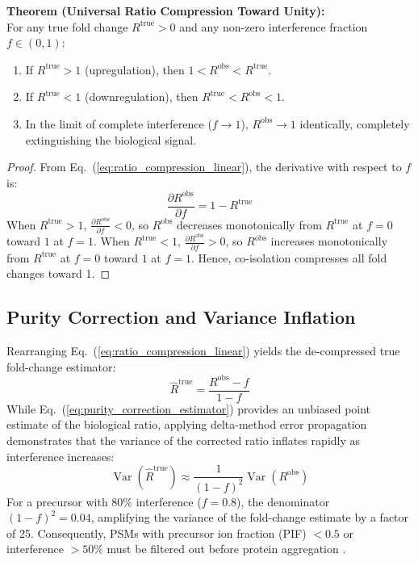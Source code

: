 \documentclass[11pt,oneside]{book}
\begin{document}
\begin{deepdive}
\textbf{Theorem (Universal Ratio Compression Toward Unity):}\\
For any true fold change $R^{\text{true}} > 0$ and any non-zero interference fraction $f \in (0, 1)$:
\begin{enumerate}
    \item If $R^{\text{true}} > 1$ (upregulation), then $1 < R^{\text{obs}} < R^{\text{true}}$.
    \item If $R^{\text{true}} < 1$ (downregulation), then $R^{\text{true}} < R^{\text{obs}} < 1$.
    \item In the limit of complete interference ($f \to 1$), $R^{\text{obs}} \to 1$ identically, completely extinguishing the biological signal.
\end{enumerate}
\begin{proof}
From Eq.~(\ref{eq:ratio_compression_linear}), the derivative with respect to $f$ is:
$$\frac{\partial R^{\text{obs}}}{\partial f} = 1 - R^{\text{true}}$$
When $R^{\text{true}} > 1$, $\frac{\partial R^{\text{obs}}}{\partial f} < 0$, so $R^{\text{obs}}$ decreases monotonically from $R^{\text{true}}$ at $f = 0$ toward $1$ at $f = 1$. When $R^{\text{true}} < 1$, $\frac{\partial R^{\text{obs}}}{\partial f} > 0$, so $R^{\text{obs}}$ increases monotonically from $R^{\text{true}}$ at $f = 0$ toward $1$ at $f = 1$. Hence, co-isolation compresses all fold changes toward 1.
\end{proof}
\end{deepdive}

\subsection{Purity Correction and Variance Inflation}
Rearranging Eq.~(\ref{eq:ratio_compression_linear}) yields the de-compressed true fold-change estimator:
\begin{equation}
\hat{R}^{\text{true}} = \frac{R^{\text{obs}} - f}{1 - f}
\label{eq:purity_correction_estimator}
\end{equation}
While Eq.~(\ref{eq:purity_correction_estimator}) provides an unbiased point estimate of the biological ratio, applying delta-method error propagation demonstrates that the variance of the corrected ratio inflates rapidly as interference increases:
\begin{equation}
\operatorname{Var}\left( \hat{R}^{\text{true}} \right) \approx \frac{1}{(1 - f)^2} \operatorname{Var}\left( R^{\text{obs}} \right)
\label{eq:variance_inflation}
\end{equation}
For a precursor with $80\%$ interference ($f = 0.8$), the denominator $(1 - f)^2 = 0.04$, amplifying the variance of the fold-change estimate by a factor of 25. Consequently, PSMs with precursor ion fraction (PIF) $< 0.5$ or interference $> 50\%$ must be filtered out before protein aggregation \cite{savitski2014tpp, mertins2018cptac}.
\end{document}
